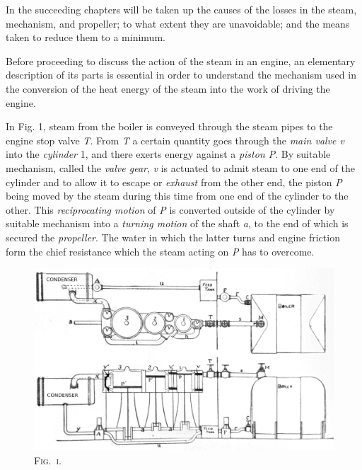 \documentclass[11pt, a5paper]{book}
\begin{document}
In the succeeding chapters will be taken up the causes of the losses
in the steam, mechanism, and propeller; to what extent they are
unavoidable; and the means taken to reduce them to a minimum.\par

Before proceeding to discuss the action of the steam in an engine, an
elementary description of its parts is essential in order to
understand the mechanism used in the conversion of the heat energy of
the steam into the work of driving the engine.\par

In Fig. 1, steam from the boiler is conveyed through the steam pipes
to the engine stop valve \textit{T}.  From \textit{T} a certain
quantity goes through the \textit{main valve v} into the
\textit{cylinder} 1, and there exerts energy against a \textit{piston
 P}.  By suitable mechanism, called the \textit{valve gear},
\textit{v} is actuated to admit steam to one end of the cylinder and
to allow it to escape or \textit{exhaust} from the other end, the
piston \textit{P} being moved by the steam during this time from one
end of the cylinder to the other.  This \textit{reciprocating motion}
of \textit{P} is converted outside of the cylinder by suitable
mechanism into a \textit{turning motion} of the shaft \textit{a}, to
the end of which is secured the \textit{propeller}.  The water in
which the latter turns and engine friction form the chief resistance
which the steam acting on \textit{P} has to overcome.\par

\begin{figure}[h]
  \centering
  \includegraphics[scale=0.5]{fig_1.jpg}
  \caption*{\textsc{Fig.\ i.}}
\end{figure}
\end{document}
